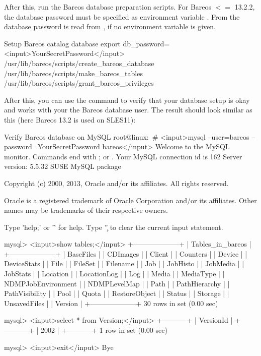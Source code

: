 After this, run the Bareos database preparation scripts.
For Bareos $<=$ 13.2.2, the database password must be specified as environment variable .
From  
the database password is read from \configFileDirUnix, if no environment variable is given.

\begin{commands}{Setup Bareos catalog database}
export db_password=<input>YourSecretPassword</input>
/usr/lib/bareos/scripts/create_bareos_database
/usr/lib/bareos/scripts/make_bareos_tables
/usr/lib/bareos/scripts/grant_bareos_privileges
\end{commands}

After this, you can use the  command to verify that your database setup is okay
and works with your the Bareos database user.
The result should look similar as this (here Bareos 13.2 is used on SLES11):

\begin{commands}{Verify Bareos database on MySQL}
root@linux:~# <input>mysql --user=bareos --password=YourSecretPassword bareos</input>
Welcome to the MySQL monitor.  Commands end with ; or \g.
Your MySQL connection id is 162
Server version: 5.5.32 SUSE MySQL package

Copyright (c) 2000, 2013, Oracle and/or its affiliates. All rights reserved.

Oracle is a registered trademark of Oracle Corporation and/or its
affiliates. Other names may be trademarks of their respective
owners.

Type 'help;' or '\h' for help. Type '\c' to clear the current input statement.

mysql> <input>show tables;</input>
+--------------------+
| Tables_in_bareos   |
+--------------------+
| BaseFiles          |
| CDImages           |
| Client             |
| Counters           |
| Device             |
| DeviceStats        |
| File               |
| FileSet            |
| Filename           |
| Job                |
| JobHisto           |
| JobMedia           |
| JobStats           |
| Location           |
| LocationLog        |
| Log                |
| Media              |
| MediaType          |
| NDMPJobEnvironment |
| NDMPLevelMap       |
| Path               |
| PathHierarchy      |
| PathVisibility     |
| Pool               |
| Quota              |
| RestoreObject      |
| Status             |
| Storage            |
| UnsavedFiles       |
| Version            |
+--------------------+
30 rows in set (0.00 sec)

mysql> <input>select * from Version;</input>
+-----------+
| VersionId |
+-----------+
|      2002 |
+-----------+
1 row in set (0.00 sec)

mysql> <input>exit</input>
Bye
\end{commands}


